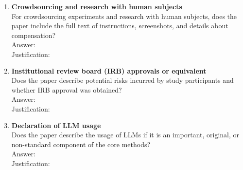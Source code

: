 \begin{enumerate}
\item {\bf Crowdsourcing and research with human subjects}\\
For crowdsourcing experiments and research with human subjects, does the paper include the full
text of instructions, screenshots, and details about compensation?\\
Answer: \answerNA{}\\
Justification: 

\item {\bf Institutional review board (IRB) approvals or equivalent}\\
Does the paper describe potential risks incurred by study participants and whether IRB approval
was obtained?\\
Answer: \answerNA{}\\
Justification: 

\item {\bf Declaration of LLM usage}\\
Does the paper describe the usage of LLMs if it is an important, original, or non-standard
component of the core methods?\\
Answer: \answerNA{}\\
Justification: 

\end{enumerate}

